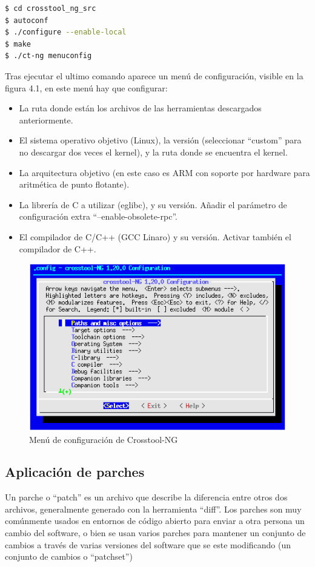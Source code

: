 \documentclass{tfg}
\begin{document}
\begin{lstlisting}[language=bash,caption=Configuración de Crosstool-NG]
$ cd crosstool_ng_src
$ autoconf
$ ./configure --enable-local
$ make
$ ./ct-ng menuconfig
\end{lstlisting}
%

Tras ejecutar el ultimo comando aparece un menú de configuración, visible en la figura 4.1, en este menú
hay que configurar:
\begin{itemize}
	\item La ruta donde están los archivos de las herramientas descargados anteriormente.
	\item El sistema operativo objetivo (Linux), la versión (seleccionar ``custom'' para no descargar dos veces el kernel), y la ruta donde se encuentra el kernel.
	\item La arquitectura objetivo (en este caso es ARM con soporte por hardware para aritmética de punto flotante).
	\item La librería de C a utilizar (eglibc), y su versión. Añadir el parámetro de configuración extra ``--enable-obsolete-rpc''.
	\item El compilador de C/C++ (GCC Linaro) y su versión. Activar también el compilador de C++.
\end{itemize}

\begin{figure}[hb]
	\centering
	\includegraphics[scale=0.8]{images/ctng_menu}
	\caption{Menú de configuración de Crosstool-NG}
\end{figure}

\subsection{Aplicación de parches}
Un parche o ``patch'' es un archivo que describe la diferencia entre otros dos archivos, generalmente generado con la herramienta ``diff''. Los parches son muy comúnmente usados en entornos de código abierto para enviar a otra persona un cambio del software, o bien se usan varios parches para mantener un conjunto de cambios a través de varias versiones del software que se este modificando (un conjunto de cambios o ``patchset'')
\end{document}
